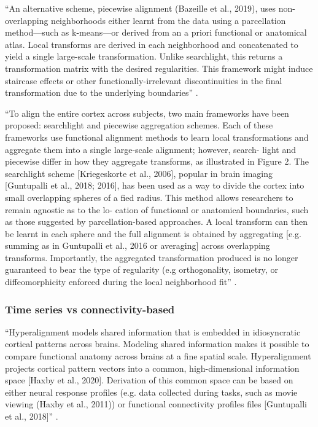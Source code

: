 ``An alternative scheme, piecewise alignment (Bazeille et al., 2019), uses
non-overlapping neighborhoods either learnt from the data using a parcellation
method—such as k-means—or derived from an a priori functional or anatomical
atlas. Local transforms are derived in each neighborhood and concatenated to
yield a single large-scale transformation. Unlike searchlight, this returns a
transformation matrix with the desired regularities. This framework might induce
staircase effects or other functionally-irrelevant discontinuities in the final
transformation due to the underlying boundaries'' \citep{bazeille2021empirical}.

``To align the entire cortex across subjects, two main frameworks have been
proposed: searchlight and piecewise aggregation schemes. Each of these
frameworks use functional alignment methods to learn local transformations and
aggregate them into a single large-scale alignment; however, search- light and
piecewise differ in how they aggregate transforms, as illustrated in Figure 2.
The searchlight scheme [Kriegeskorte et al., 2006], popular in brain imaging
[Guntupalli et al., 2018; 2016], has been used as a way to divide the cortex
into small overlapping spheres of a fied radius. This method allows researchers
to remain agnostic as to the lo- cation of functional or anatomical boundaries,
such as those suggested by parcellation-based approaches. A local transform can
then be learnt in each sphere and the full alignment is obtained by aggregating
[e.g. summing as in Guntupalli et al., 2016 or averaging] across overlapping
transforms. Importantly, the aggregated transformation produced is no longer
guaranteed to bear the type of regularity (e.g orthogonality, isometry, or
diffeomorphicity enforced during the local neighborhood fit''
\citep{bazeille2021empirical}.


\subsubsection{Time series vs connectivity-based}


%
``Hyperalignment models shared information that is embedded in idiosyncratic
cortical patterns across brains. Modeling shared information makes it possible
to compare functional anatomy across brains at a fine spatial scale.
Hyperalignment projects cortical pattern vectors into a common, high-dimensional
information space [Haxby et al., 2020]. Derivation of this common space can be
based on either neural response profiles (e.g. data collected during tasks, such
as movie viewing (Haxby et al., 2011)) or functional connectivity profiles files
[Guntupalli et al., 2018]'' \citep{busch2021hybrid}.

